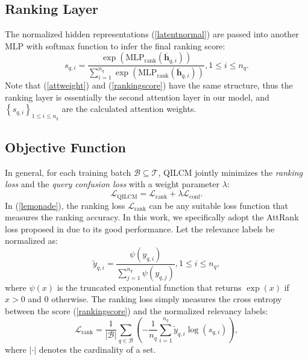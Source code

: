 \documentclass[letterpaper]{article} %
\begin{document}
\subsection{Ranking Layer}

The normalized hidden representations (\ref{latentnormal}) are passed into another MLP with softmax function to infer the final ranking score:
\begin{equation}
\label{rankingscore}
{{s}_{q,i}}=\frac{\exp \left( \text{ML}{{\text{P}}_{\text{rank}}}\left( {{\overline{\mathbf{h}}}_{q,i}} \right) \right)}{\sum\limits_{i=1}^{{{n}_{q}}}{\exp \left( \text{ML}{{\text{P}}_{\text{rank}}}\left( {{\overline{\mathbf{h}}}_{q,i}} \right) \right)}},1\le i\le {{n}_{q}}.
\end{equation}
Note that (\ref{attweight}) and (\ref{rankingscore}) have the same structure, thus the ranking layer is essentially the second attention layer in our model, and ${{\left\{ {{s}_{q,i}} \right\}}_{1\le i\le {{n}_{q}}}}$ are the calculated attention weights.

\subsection{Objective Function}

In general, for each training batch $\mathcal{B}\subseteq \mathcal{T}$, QILCM jointly minimizes the \textit{ranking loss} and the \textit{query confusion loss} with a weight parameter $\lambda$:
\begin{equation}
\label{lemonade}
{{\mathcal{L}}_{\text{QILCM}}}={{\mathcal{L}}_{\text{rank}}}+\lambda {{\mathcal{L}}_{\text{conf}}}.
\end{equation}
In (\ref{lemonade}), the ranking loss $ {\mathcal{L}}_{\text{rank}} $ can be any suitable loss function that measures the ranking accuracy. In this work, we specifically adopt the AttRank loss proposed in \cite{ai2018learning} due to its good performance. Let the relevance labels be normalized as:
\begin{equation}
\label{labelnormmalization}
{{\widetilde{y}}_{q,i}}=\frac{\psi \left( {{y}_{q,i}} \right)}{\sum\limits_{j=1}^{{{n}_{q}}}{\psi \left( {{y}_{q,j}} \right)}},1\le i\le n_{q},
\end{equation}
where $\psi \left( x  \right)$ is the truncated exponential function that returns $\exp \left( x \right)$ if $x>0$ and 0 otherwise.
The ranking loss simply measures the cross entropy between the score (\ref{rankingscore}) and the normalized relevancy labels:
\begin{equation}
\label{cross entropy}
{{\mathcal{L}}_{\text{rank}}}=\frac{1}{\left| \mathcal{B} \right|}\sum\limits_{q\in \mathcal{B}}{\left( -\frac{1}{{{n}_{q}}}\sum\limits_{i=1}^{{{n}_{q}}}{{{\widetilde{y}}_{q,i}}\log \left( {{s}_{q,i}} \right)} \right)},
\end{equation}
where $\left| \cdot \right|$ denotes the cardinality of a set.
\end{document}
